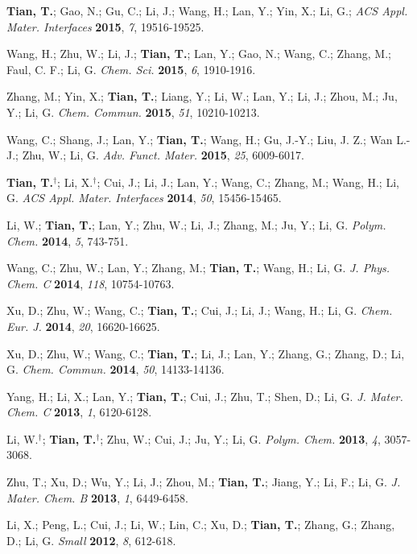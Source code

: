 \begin{cventries}
{\begin{cvenum}
    \item \textbf{Tian, T.}; Gao, N.; Gu, C.; Li, J.; Wang, H.; Lan,
Y.; Yin, X.; Li, G.; \textit{ACS Appl. Mater. Interfaces}
\textbf{2015}, \textit{7}, 19516-19525.
  \item Wang, H.; Zhu, W.; Li, J.; \textbf{Tian, T.}; Lan, Y.; Gao,
N.; Wang, C.; Zhang, M.; Faul, C. F.; Li, G. \textit{Chem. Sci.}
\textbf{2015}, \textit{6}, 1910-1916.
  \item Zhang, M.; Yin, X.; \textbf{Tian, T.}; Liang, Y.; Li, W.; Lan,
Y.; Li, J.; Zhou, M.; Ju, Y.; Li, G. \textit{Chem. Commun.}
\textbf{2015}, \textit{51}, 10210-10213.
  \item Wang, C.; Shang, J.; Lan, Y.; \textbf{Tian, T.}; Wang, H.; Gu,
J.-Y.; Liu, J. Z.; Wan L.-J.; Zhu, W.; Li,
G. \textit{Adv. Funct. Mater.} \textbf{2015}, \textit{25}, 6009-6017.
  \item \textbf{Tian, T.}$^{\dagger}$; Li, X.$^{\dagger}$; Cui, J.;
Li, J.; Lan, Y.; Wang, C.; Zhang, M.; Wang, H.; Li, G. \textit{ACS
Appl. Mater. Interfaces} \textbf{2014}, \textit{50}, 15456-15465.
\item Li, W.; \textbf{Tian, T.}; Lan, Y.; Zhu, W.; Li, J.;
  Zhang, M.;
  Ju, Y.; Li, G. \textit{Polym. Chem.} \textbf{2014}, \textit{5}, 743-751.
  \item Wang, C.; Zhu, W.; Lan, Y.; Zhang, M.; \textbf{Tian, T.};
    Wang, H.;
    Li, G. \textit{J. Phys. Chem. C} \textbf{2014},
\textit{118}, 10754-10763.
  \item Xu, D.; Zhu, W.; Wang, C.; \textbf{Tian, T.}; Cui, J.; Li, J.; Wang, H.; Li, G. \textit{Chem. Eur. J.} \textbf{2014}, \textit{20},
16620-16625.
  \item Xu, D.; Zhu, W.; Wang, C.; \textbf{Tian, T.}; Li, J.; Lan, Y.;
Zhang, G.; Zhang, D.; Li, G. \textit{Chem. Commun.} \textbf{2014},
\textit{50}, 14133-14136.
  \item Yang, H.; Li, X.; Lan, Y.; \textbf{Tian, T.}; Cui, J.; Zhu,
T.; Shen, D.; Li, G. \textit{J. Mater. Chem. C} \textbf{2013},
\textit{1}, 6120-6128.
  \item Li, W.$^{\dagger}$; \textbf{Tian, T.}$^{\dagger}$; Zhu, W.;
Cui, J.; Ju, Y.; Li, G. \textit{Polym. Chem.} \textbf{2013},
\textit{4}, 3057-3068.
  \item Zhu, T.; Xu, D.; Wu, Y.; Li, J.; Zhou, M.; \textbf{Tian, T.};
Jiang, Y.; Li, F.; Li, G. \textit{J. Mater. Chem. B} \textbf{2013},
\textit{1}, 6449-6458.    
  \item Li, X.; Peng, L.; Cui, J.; Li, W.; Lin, C.; Xu, D.;
\textbf{Tian, T.}; Zhang, G.; Zhang, D.; Li, G. \textit{Small}
\textbf{2012}, \textit{8}, 612-618.
    \end{cvenum}
  }
\end{cventries}




